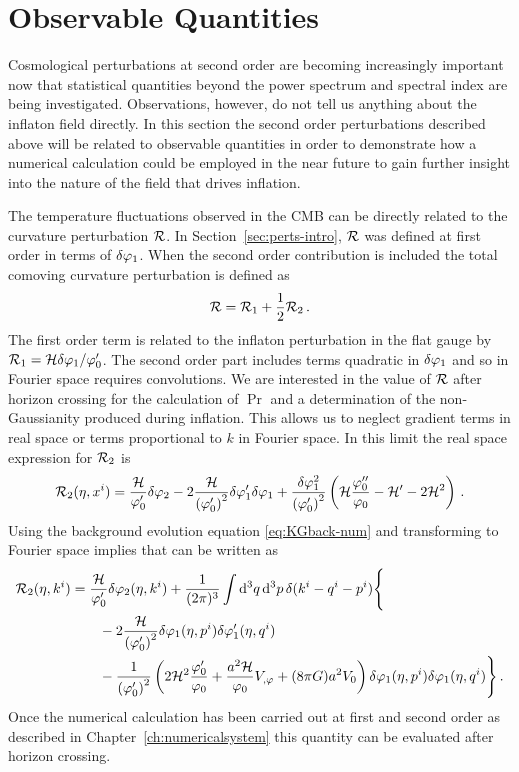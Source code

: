 \section{Observable Quantities}
\label{sec:observable-perts}

Cosmological perturbations at second order are becoming increasingly important now
that
statistical quantities beyond the power spectrum and spectral index are being
investigated. Observations, however, do not tell us anything about the inflaton
field directly. In this section the second order perturbations described above will
be related to observable quantities in order to demonstrate how a numerical
calculation could
be employed in the near future to gain further insight into the nature of the field
that drives inflation.
% 

The temperature fluctuations observed in the CMB can
be directly related to the curvature perturbation $\mathcal{R}$. In
Section~\ref{sec:perts-intro}, $\mathcal{R}$ was defined at first order in terms of $\delta\varphi_{1}$.
When the second order contribution is included the total comoving curvature
perturbation is defined as
% 
\begin{equation}
\label{eq:Rfulldefn-perts}
 \mathcal{R} = \mathcal{R}_1 + \frac{1}{2}\mathcal{R}_2\,.
\end{equation}
% 
The first order term is related to the inflaton perturbation in the flat gauge by
$\mathcal{R}_1
= \mathcal{H}\delta\varphi_{1}/\varphi_0'$. The second order part includes terms quadratic in $\delta\varphi_{1}$ and so
in Fourier space requires convolutions. We are interested in the value of $\mathcal{R}$ after
horizon crossing for the calculation of $\Pr$ and a determination of the
non-Gaussianity produced during inflation. This allows us to neglect gradient terms
in real space or terms proportional to $k$ in Fourier space.
In this limit the real space expression for $\mathcal{R}_2$ is \cite{Malik:2005cy}
% 
\begin{equation}
 \label{eq:R2real-perts}
\mathcal{R}_2(\eta, x^i) = \frac{\mathcal{H}}{\varphi_0'}\delta\varphi_{2} - 2\frac{\mathcal{H}}{\left(\varphi_0'\right)^2}
\delta\varphi_{1}'\delta\varphi_{1} + \frac{\delta\varphi_{1}^2}{\left(\varphi_0'\right)^2}\left(\mathcal{H}\frac{\varphi_0''}{\varphi_0} 
 - \mathcal{H}' -2\mathcal{H}^2 \right)\,.
\end{equation}
% 
Using the background evolution equation \eqref{eq:KGback-num} and transforming to
Fourier space implies that  can be written as
% 
\begin{align}
 \R_2(\eta, \kvi) &= \frac{\H}{\vp_0'}\dvp2(\eta, \kvi) 
  + \frac{1}{(2\pi)^3}\int \d^3q\, \d^3p\, \delta(\kvi-\qvi-\pvi) \Bigg\{
\nonumber\\
% 
 &\qquad -2\frac{\H}{\left(\vp_0'\right)^2} \dvp1(\eta, \pvi)\dvp1'(\eta, \qvi) \nonumber\\
%  
&\qquad -\frac{1}{\left(\vp_0'\right)^2} \left(
  2\H^2 \frac{\vp_0'}{\vp_0} + \frac{a^2 \H}{\vp_0}\Uphi + (8\pi G)a^2 \U
 \right)
\dvp1(\eta,\pvi) \dvp1(\eta, \qvi)\Bigg\}\,.
\end{align}
% 
Once the numerical calculation has been carried out at first and second order as
described in Chapter~\ref{ch:numericalsystem} this quantity can be evaluated after
horizon crossing.

